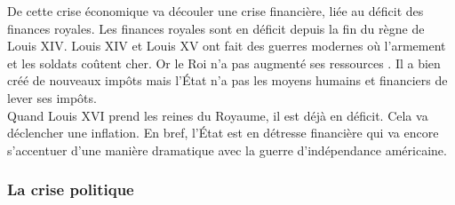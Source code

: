 \documentclass[10pt, a4paper, openany]{book}
\begin{document}
De cette crise économique va découler une crise financière, liée au déficit des finances royales. Les finances royales sont en déficit depuis la fin du règne de Louis XIV. Louis XIV et Louis XV ont fait des guerres modernes où l'armement et les soldats coûtent cher. Or le Roi n'a pas augmenté ses ressources . Il a bien créé de nouveaux impôts mais l'État n'a pas les moyens humains et financiers de lever ses impôts. \\
Quand Louis XVI prend les reines du Royaume, il est déjà en déficit. Cela va déclencher une inflation. En bref, l'État est en détresse financière qui va encore s'accentuer d'une manière dramatique avec la guerre d'indépendance américaine. 


\subsubsection{La crise politique}
\end{document}
